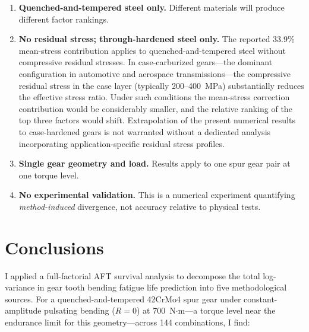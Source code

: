 \documentclass[12pt,a4paper]{article}
\begin{document}
\begin{enumerate}
        limited. Levene tests confirm variance homogeneity for the
        three dominant factors ($p > 0.5$). The censoring pattern is
        physically interpretable (run-outs cluster with Gerber
        correction and ground surfaces; \S\ref{sec:torque}) and is
        unlikely to be informative in the sense of masking
        factor-dependent effects.
  \item \textbf{Quenched-and-tempered steel only.} Different materials
        will produce different factor rankings.
  \item \textbf{No residual stress; through-hardened steel only.} The
        reported 33.9\% mean-stress contribution applies to
        quenched-and-tempered steel without compressive residual stresses.
        In case-carburized gears---the dominant configuration in automotive
        and aerospace transmissions---the compressive residual stress in the
        case layer (typically 200--400~MPa) substantially reduces the
        effective stress ratio. Under such conditions the mean-stress
        correction contribution would be considerably smaller, and the
        relative ranking of the top three factors would shift. Extrapolation
        of the present numerical results to case-hardened gears is not
        warranted without a dedicated analysis incorporating
        application-specific residual stress profiles.
  \item \textbf{Single gear geometry and load.} Results apply to one spur
        gear pair at one torque level.
  \item \textbf{No experimental validation.} This is a numerical
        experiment quantifying \emph{method-induced} divergence, not
        accuracy relative to physical tests.
\end{enumerate}

\section{Conclusions}
\label{sec:conclusions}

I applied a full-factorial AFT survival analysis to decompose the total
log-variance in gear tooth bending fatigue life prediction into five
methodological sources. For a quenched-and-tempered 42CrMo4 spur gear
under constant-amplitude pulsating bending ($R=0$) at 700~N$\cdot$m---a
torque level near the endurance limit for this geometry---across 144
combinations, I find:
\end{document}
